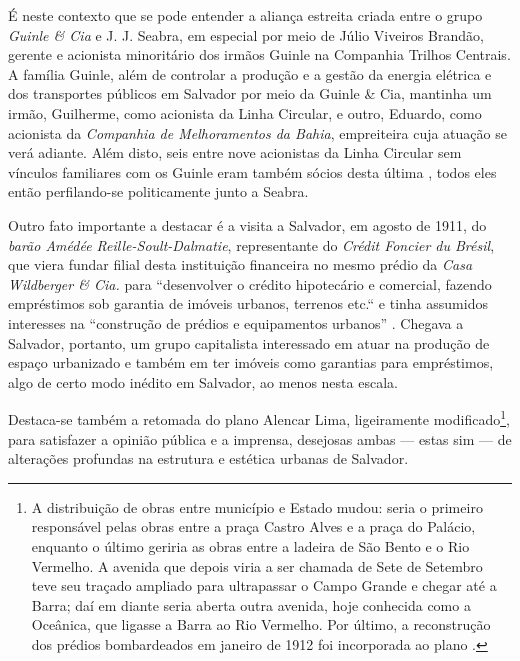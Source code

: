 É neste contexto que se pode entender a aliança estreita criada entre o grupo \textit{Guinle \& Cia} e J. J. Seabra, em especial por meio de Júlio Viveiros Brandão, gerente e acionista minoritário dos irmãos Guinle na Companhia Trilhos Centrais. A família Guinle, além de controlar a produção e a gestão da energia elétrica e dos transportes públicos em Salvador por meio da Guinle \& Cia, mantinha um irmão, Guilherme, como acionista da Linha Circular, e outro, Eduardo, como acionista da \textit{Companhia de Melhoramentos da Bahia}, empreiteira cuja atuação se verá adiante. Além disto, seis entre nove acionistas da Linha Circular sem vínculos familiares com os Guinle eram também sócios desta última \cite[pp.~122]{CUNHA2011}, todos eles então perfilando-se politicamente junto a Seabra.

Outro fato importante a destacar é a visita a Salvador, em agosto de 1911, do \textit{barão Amédée Reille-Soult-Dalmatie}, representante do \textit{Crédit Foncier du Brésil}, que viera fundar filial desta instituição financeira no mesmo prédio da \textit{Casa Wildberger \& Cia.} para ``desenvolver o crédito hipotecário e comercial, fazendo empréstimos sob garantia de imóveis urbanos, terrenos etc.`` e tinha assumidos interesses na ``construção de prédios e equipamentos urbanos'' \cite[pp.~115-116]{CUNHA2011}. Chegava a Salvador, portanto, um grupo capitalista interessado em atuar na produção de espaço urbanizado e também em ter imóveis como garantias para empréstimos, algo de certo modo inédito em Salvador, ao menos nesta escala.

Destaca-se também a retomada do plano Alencar Lima, ligeiramente modificado\footnote{A distribuição de obras entre município e Estado mudou: seria o primeiro responsável pelas obras entre a praça Castro Alves e a praça do Palácio, enquanto o último geriria as obras entre a ladeira de São Bento e o Rio Vermelho. A avenida que depois viria a ser chamada de Sete de Setembro teve seu traçado ampliado para ultrapassar o Campo Grande e chegar até a Barra; daí em diante seria aberta outra avenida, hoje conhecida como a Oceânica, que ligasse a Barra ao Rio Vermelho. Por último, a reconstrução dos prédios bombardeados em janeiro de 1912 foi incorporada ao plano \cite[p.~101]{CUNHA2011}.}, para satisfazer a opinião pública e a imprensa, desejosas ambas --- estas sim --- de alterações profundas na estrutura e estética urbanas de Salvador.

